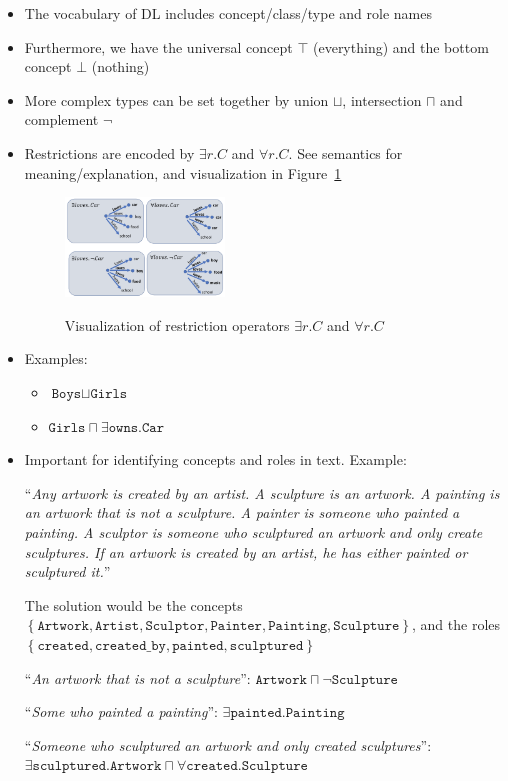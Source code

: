 \begin{itemize}
	\item The vocabulary of DL includes concept/class/type and role names
	\item Furthermore, we have the universal concept $\top$ (everything) and the bottom concept $\bot$ (nothing)
	\item More complex types can be set together by union $\sqcup$, intersection $\sqcap$ and complement $\lnot$
	\item Restrictions are encoded by $\exists r.C$ and $\forall r.C$. See semantics for meaning/explanation, and visualization in Figure~\ref{fig:kr_dl_restriction_operator_visualized}
	\begin{figure}[ht!]
		\centering
		\includegraphics[width=0.4\textwidth]{figures/kr_dl_restriction_operator_visualized.png}
		\label{fig:kr_dl_restriction_operator_visualized}
		\caption{Visualization of restriction operators $\exists r.C$ and $\forall r.C$}
	\end{figure}
	\item Examples:
	\begin{itemize}
		\item $\texttt{Boys} \sqcup \texttt{Girls}$
		\item $\texttt{Girls} \sqcap \exists \texttt{owns}.\texttt{Car}$
	\end{itemize}
	\item Important for identifying concepts and roles in text. Example:
	
	``\textit{Any artwork is created by an artist. A sculpture is an artwork. A painting is an artwork that is not a sculpture. A painter is someone who painted a painting. A sculptor is someone who sculptured an artwork and only create sculptures. If an artwork is created by an artist, he has either painted or sculptured it.}''
	
	The solution would be the concepts $\left\{\texttt{Artwork}, \texttt{Artist}, \texttt{Sculptor}, \texttt{Painter}, \texttt{Painting}, \texttt{Sculpture}\right\}$, and the roles $\left\{\texttt{created}, \texttt{created\_by}, \texttt{painted}, \texttt{sculptured}\right\}$
	
	``\textit{An artwork that is not a sculpture}'': $\texttt{Artwork}\sqcap \lnot\texttt{Sculpture}$
	
	``\textit{Some who painted a painting}'': $\exists \texttt{painted}.\texttt{Painting}$
	
	``\textit{Someone who sculptured an artwork and only created sculptures}'': $\exists \texttt{sculptured}.\texttt{Artwork}\sqcap \forall \texttt{created}.\texttt{Sculpture}$
\end{itemize}
